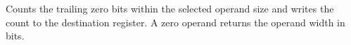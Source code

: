 Counts the trailing zero bits within the selected operand size and writes the count to the destination register. A zero operand returns the operand width in bits.
